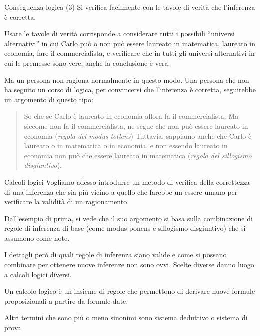 \documentclass[aspectratio=169,10pt,dvipsnames,xcolor=table,handout]{beamer}
\begin{document}
\begin{frame}{Conseguenza logica (3)}
    Si verifica facilmente con le tavole di verità che l'inferenza è corretta.

    \medskip
    Usare le tavole di verità corrisponde a considerare tutti i possibili ``universi alternativi'' in cui Carlo può o non può essere laureato in matematica, laureato in economia, fare il commercialista, e verificare che in tutti gli universi alternativi in cui le premesse sono vere, anche la conclusione è vera.

    \medskip
    Ma un persona non ragiona normalmente in questo modo. Una persona che non ha seguito un corso di logica, per convincersi che l'inferenza è corretta, seguirebbe un argomento di questo tipo:

    \smallskip
    \begin{quote}
        So che se Carlo è laureato in economia allora fa il commercialista. Ma siccome non fa il commercialista, ne segue che non può essere laureato in economia (\textit{regola del modus tollens}) Tuttavia, sappiamo anche che Carlo è laureato o in matematica o in economia, e non essendo laureato in economia non può che essere laureato in matematica (\textit{regola del sillogismo disgiuntivo}).
    \end{quote}
\end{frame}

\begin{frame}{Calcoli logici}
    Vogliamo adesso introdurre un metodo di verifica della correttezza di una inferenza che sia più vicino a quello che farebbe un essere umano per verificare la validità di un ragionamento.

    \medskip
    Dall'esempio di prima, si vede che il suo argomento si basa sulla combinazione di regole di inferenza di base (come modus ponens e sillogismo disgiuntivo) che si assumono come note.

    \medskip
    I dettagli però di quali regole di inferenza siano valide e come si possano combinare per ottenere nuove inferenze non sono ovvi. Scelte diverse danno luogo a \alert{calcoli logici} diversi.

    \begin{definition}
        Un \alert{calcolo logico} è un insieme di regole che permettono di derivare nuove formule proposizionali a partire da formule date.

        \smallskip
        Altri termini che sono più o meno sinonimi sono \alert{sistema deduttivo} o \alert{sistema di prova}.
    \end{definition}
\end{frame}
\end{document}

